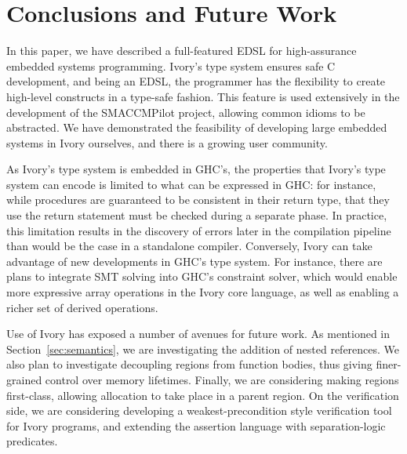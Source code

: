\section{Conclusions and Future Work}
\label{sec:conclusion}

In this paper, we have described a full-featured EDSL for high-assurance
embedded systems programming. Ivory's type system ensures safe C development,
and being an EDSL, the programmer has the flexibility to create high-level
constructs in a type-safe fashion. This feature is used extensively in the
development of the SMACCMPilot project, allowing common idioms to be abstracted.
We have demonstrated the feasibility of developing large embedded systems in
Ivory ourselves, and there is a growing user community.

As Ivory's type system is embedded in GHC's, the properties that Ivory's type
system can encode is limited to what can be expressed in GHC: for instance,
while procedures are guaranteed to be consistent in their return type, that they
use the return statement must be checked during a separate phase.  In practice,
this limitation results in the discovery of errors later in the compilation
pipeline than would be the case in a standalone compiler.  Conversely, Ivory can
take advantage of new developments in GHC's type system.  For instance, there
are plans to integrate SMT solving into GHC's constraint solver, which would
enable more expressive array operations in the Ivory core language, as well as
enabling a richer set of derived operations.

Use of Ivory has exposed a number of avenues for future work. As mentioned in
Section~\autoref{sec:semantics}, we are investigating the addition of nested
references.  We also plan to investigate decoupling regions from function
bodies, thus giving finer-grained control over memory lifetimes.  Finally, we
are considering making regions first-class, allowing allocation to take place in
a parent region.  On the verification side, we are considering developing a
weakest-precondition style verification tool for Ivory programs, and extending
the assertion language with separation-logic predicates.
